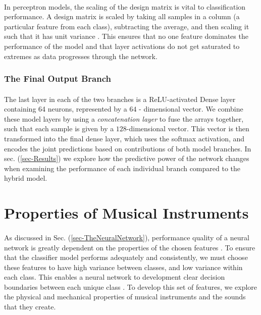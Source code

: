 \documentclass[12pt,letterpaper]{article}
\begin{document}
\paragraph*{}In perceptron models, the scaling of the design matrix is vital to classification performance. A design matrix is scaled by taking all samples in a column (a particular feature from each class), subtracting the average, and then scaling it such that it has unit variance \cite{Geron,James}. This ensures that no one feature dominates the performance of the model and that layer activations do not get saturated to extremes as data progresses through the network.


\subsubsection{The Final Output Branch}

\paragraph*{}The last layer in each of the two branches is a ReLU-activated Dense layer containing 64 neurons, represented by a $64$ - dimensional vector. We combine these model layers by using a \textit{concatenation layer} to fuse the arrays together, such that each sample is given by a $128$-dimensional vector. This vector is then transformed into the final dense layer, which uses the softmax activation, and encodes the joint predictions based on contributions of both model branches. In sec. (\ref{sec-Results}) we explore how the predictive power of the network changes when examining the performance of each individual branch compared to the hybrid model.


\newpage
\section{Properties of Musical Instruments}
\label{sec-Instruments}

\paragraph*{}As discussed in Sec. (\ref{sec-TheNeuralNetwork}), performance quality of a neural network is greatly dependent on the properties of the chosen features \cite{Virtanen,Liu}. To ensure that the classifier model performs adequately and consistently, we must choose these features to have high variance between classes, and low variance within each class. This enables a neural network to development clear decision boundaries between each unique class \cite{James,Serizel}. To develop this set of features, we explore the physical and mechanical properties of musical instruments and the sounds that they create.
\end{document}
